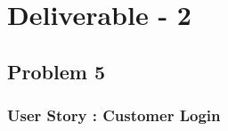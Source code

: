 \documentclass[a4paper,12pt]{report}
\begin{document}

\newpage

\tableofcontents




\chapter*{\centering Deliverable - 2}

\section{Problem 5}

\setlength\arrayrulewidth{2pt}
\FloatBarrier





\subsection{User Story : Customer Login}
\end{document}

